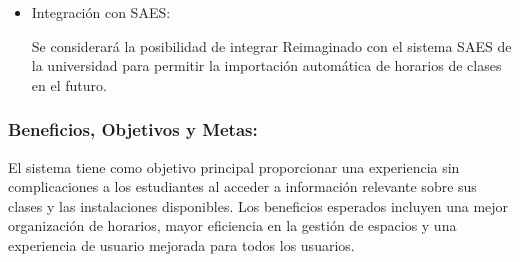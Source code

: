 \begin{itemize}
        \item {
              Integración con SAES:

              Se considerará la posibilidad de integrar Reimaginado con el sistema SAES de la universidad para permitir la importación automática de horarios de clases en el futuro.
              }
\end{itemize}

\subsubsection{Beneficios, Objetivos y Metas:}

El sistema tiene como objetivo principal proporcionar una experiencia sin complicaciones a los estudiantes al acceder a información relevante sobre sus clases y las instalaciones disponibles. Los beneficios esperados incluyen una mejor organización de horarios, mayor eficiencia en la gestión de espacios y una experiencia de usuario mejorada para todos los usuarios.








